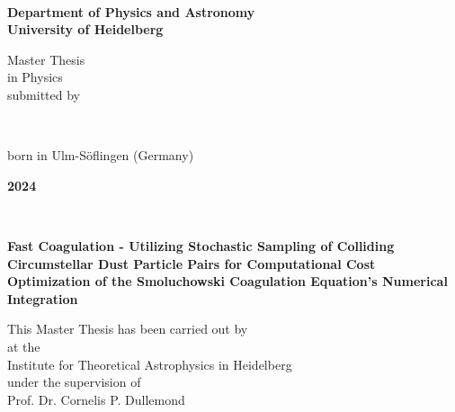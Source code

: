 \begin{titlepage}
    \ 
\end{titlepage}

\begin{titlepage}
    \begin{center}
        \begin{Large}
            \textbf{
              Department of Physics and Astronomy \\
              University of Heidelberg
            }
        \end{Large}

        \vfill
        
        Master Thesis \\
        in Physics \\
        submitted by \\
        \vspace{0.5cm}

        \begin{Large}
            \textbf{\theauthor} \\
        \end{Large}
        \vspace{0.5cm}

        born in Ulm-Söflingen (Germany) \\
        \vspace{0.5cm}

        \begin{Large}
            \textbf{2024}
        \end{Large}
    \end{center}
\end{titlepage}

\begin{titlepage}
    \ 
\end{titlepage}

\begin{titlepage}
    \begin{center}
        \begin{Large}
            \textbf{
                Fast Coagulation - Utilizing Stochastic Sampling of Colliding Circumstellar Dust 
                Particle Pairs for Computational Cost Optimization of the Smoluchowski Coagulation 
                Equation's Numerical Integration
            }
        \end{Large}
        
        \vfill
        
        This Master Thesis has been carried out by \theauthor \\
        at the \\
        Institute for Theoretical Astrophysics in Heidelberg \\
        under the supervision of \\
        Prof. Dr. Cornelis P. Dullemond
    \end{center}
\end{titlepage}

